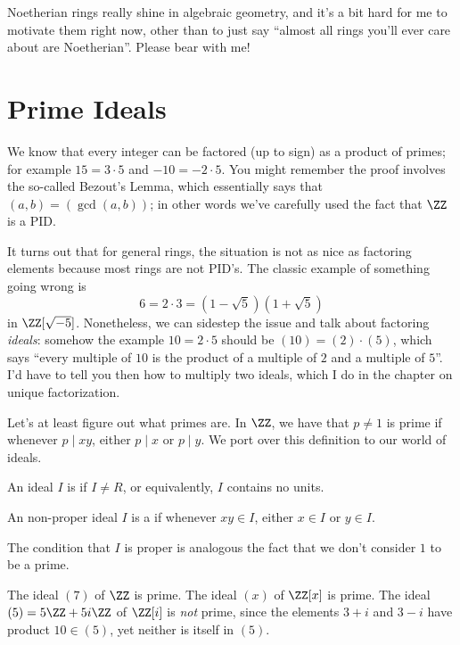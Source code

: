 Noetherian rings really shine in algebraic geometry,
and it's a bit hard for me to motivate them right now,
other than to just say ``almost all rings you'll ever care about are Noetherian''.
Please bear with me!

\section{Prime Ideals}
We know that every integer can be factored (up to sign)
as a product of primes; for example $15 = 3 \cdot 5$
and $-10 = -2 \cdot 5$.
You might remember the proof involves the so-called Bezout's Lemma,
which essentially says that $(a,b) = (\gcd(a,b))$;
in other words we've carefully used the fact that $\ZZ$ is a PID.

It turns out that for general rings, the situation is not as nice
as factoring elements because most rings are not PID's.
The classic example of something going wrong is
\[ 6 = 2 \cdot 3 = \left( 1-\sqrt5 \right)\left( 1+\sqrt5 \right) \]
in $\ZZ[\sqrt{-5}]$.
Nonetheless, we can sidestep the issue
and talk about factoring \emph{ideals}:
somehow the example $10 = 2 \cdot 5$ should be $(10) = (2) \cdot (5)$,
which says ``every multiple of $10$ is the product of a
multiple of $2$ and a multiple of $5$''.
I'd have to tell you then how to multiply two ideals, which I do
in the chapter on unique factorization.

Let's at least figure out what primes are.
In $\ZZ$, we have that $p \neq 1$ is prime if whenever $p \mid xy$,
either $p \mid x$ or $p \mid y$.
We port over this definition to our world of ideals.
\begin{definition}
	An ideal $I$ is  if $I \neq R$,
	or equivalently, $I$ contains no units.
\end{definition}
\begin{definition}
	An non-proper ideal $I$ is a 
	if whenever $xy \in I$, either $x \in I$ or $y \in I$.
\end{definition}
The condition that $I$ is proper is analogous the
fact that we don't consider $1$ to be a prime.

\begin{example}
	\listhack
	\begin{enumerate}[(a)]
		\ii The ideal $(7)$ of $\ZZ$ is prime.
		\ii The ideal $(x)$ of $\ZZ[x]$ is prime.
		\ii The ideal $(5) = 5\ZZ + 5i\ZZ$ of $\ZZ[i]$ is \emph{not} prime, since
		the elements $3+i$ and $3-i$ have product $10 \in (5)$,
		yet neither is itself in $(5)$.
	\end{enumerate}
\end{example}


